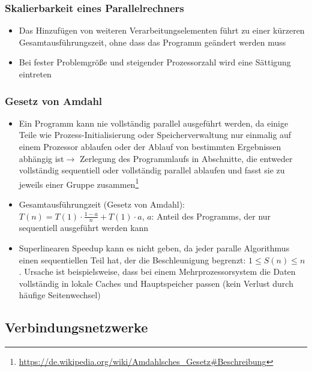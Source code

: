 \subsubsection{Skalierbarkeit eines Parallelrechners}
\begin{itemize}
	\item Das Hinzufügen von weiteren Verarbeitungselementen führt zu einer kürzeren Gesamtausführungszeit, ohne dass das Programm geändert werden muss
	\item Bei fester Problemgröße und steigender Prozessorzahl wird eine Sättigung eintreten
\end{itemize}

\subsubsection{Gesetz von Amdahl}
\begin{itemize}
	\item Ein Programm kann nie vollständig parallel ausgeführt werden, da einige Teile wie Prozess-Initialisierung oder Speicherverwaltung nur einmalig auf einem Prozessor ablaufen oder der Ablauf von bestimmten Ergebnissen abhängig ist\(\rightarrow\) Zerlegung des Programmlaufs in Abschnitte, die entweder vollständig sequentiell oder vollständig parallel ablaufen und fasst sie zu jeweils einer Gruppe zusammen\footnote{\url{https://de.wikipedia.org/wiki/Amdahlsches_Gesetz\#Beschreibung}}
	\item Gesamtausführungzeit (Gesetz von Amdahl): \(T(n) = T(1) \cdot \frac{1-a}{n} + T(1) \cdot a\), \(a\): Anteil des Programms, der nur sequentiell ausgeführt werden kann
	\item Superlinearen Speedup kann es nicht geben, da jeder paralle Algorithmus einen sequentiellen Teil hat, der die Beschleunigung begrenzt: \(1 \le S(n) \le n\). Ursache ist beispielsweise, dass bei einem Mehrprozessorsystem die Daten vollständig in lokale Caches und Hauptspeicher passen (kein Verlust durch häufige Seitenwechsel)
\end{itemize}


\subsection{Verbindungsnetzwerke}

